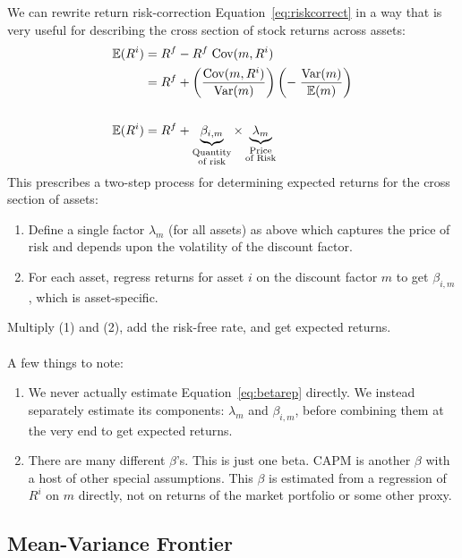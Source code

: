 \documentclass[12pt]{article}
\theoremstyle{plain}
\theoremstyle{definition}
\theoremstyle{remark}
\begin{document}
We can rewrite return risk-correction Equation~\ref{eq:riskcorrect} in a
way that is very useful for describing the cross section of stock
returns across assets:
\begin{align}
  \mathbb{E}(R^i) &=  R^f - R^f \; \text{Cov}(m,R^i) \notag\\
  &=  R^f + \left(\frac{\text{Cov}(m,R^i)}{\text{Var}(m)}\right)
  \left(-\;\frac{\text{Var}(m)}{\mathbb{E}(m)}\right)\notag\\\notag\\
  \mathbb{E}(R^i)
  &=  R^f +
  \underbrace{\beta_{i,m}}_{\substack{\text{Quantity}\\\text{of risk}}}
  \times
  \underbrace{\lambda_m}_{\substack{\text{Price}\\\text{of Risk}}}
  \label{eq:betarep}
\end{align}
This prescribes a two-step process for determining expected returns for
the cross section of assets:
\begin{enumerate}
  \item Define a single factor $\lambda_m$ (for all assets) as above
    which captures the price of risk and depends upon the volatility of
    the discount factor.

  \item For each asset, regress returns for asset $i$ on the discount
    factor $m$ to get $\beta_{i,m}$, which is asset-specific.
\end{enumerate}
Multiply (1) and (2), add the risk-free rate, and get expected returns.
\\
\\
A few things to note:
\begin{enumerate}
  \item We never actually estimate Equation~\ref{eq:betarep} directly.
    We instead separately estimate its components: $\lambda_m$ and
    $\beta_{i,m}$, before combining them at the very end to get
    expected returns.
  \item There are many different $\beta$'s. This is just one beta. CAPM
    is another $\beta$ with a host of other special assumptions. This
    $\beta$ is estimated from a regression of $R^i$ on $m$ directly, not
    on returns of the market portfolio or some other proxy.
\end{enumerate}


\subsection{Mean-Variance Frontier}
\end{document}
